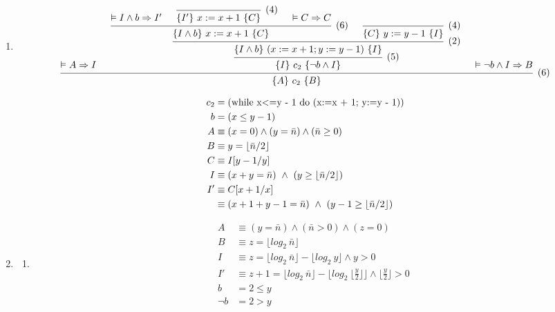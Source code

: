 \documentclass{article}
\begin{document}
\begin{enumerate}[1)]
    \item %
    \begin{align*}
        \begin{prooftree}
            \hypo{\vDash A \Rightarrow I}
            \hypo{\vDash I \land b \Rightarrow I'}
            \infer0[(4)]{\{I'\}\ x:=x + 1\ \{C\}}
            \hypo{\vDash C \Rightarrow C}
            \infer3[(6)]{\{I \land b\}\ x:=x + 1\ \{C\}}
            \infer0[(4)]{\{C\}\ y:=y - 1\ \{I\}}
            \infer2[(2)]{\{I \land b\}\ (x:=x + 1; y:=y - 1)\ \{I\}}
            \infer1[(5)]{\{I\}\ c_2\ \{\neg b \land I\}}
            \hypo{\vDash \neg b \land I \Rightarrow B}
            \infer3[(6)]{\{A\}\ c_2\ \{B\}}
        \end{prooftree}
    \end{align*}

    \begin{align*}
        c_2 &= \text{(while x\textless=y - 1 do (x:=x + 1; y:=y - 1))} \\
        b &= (x \leq y-1) \\
        A &\equiv (x = 0) \land (y = \bar{n}) \land (\bar{n} \geq 0) \\
        B &\equiv y = \lfloor \bar{n}/2 \rfloor \\
        C &\equiv I[y-1/y] \\
        I &\equiv (x + y = \bar{n})\ \land\ (y \geq \lfloor \bar{n} / 2 \rfloor) \\
        I' &\equiv C[x+1/x] \\
        &\equiv (x + 1 + y - 1 = \bar{n})\ \land\ (y - 1 \geq \lfloor \bar{n} / 2 \rfloor) \\
    \end{align*}

    \item %
    \begin{enumerate}
        \item %
        \begin{align*}
            A &\equiv (y = \bar{n}) \land (\bar{n} > 0) \land (z = 0) \\
            B &\equiv z = \lfloor log_2\ \bar{n} \rfloor \\
            I &\equiv z = \lfloor log_2\ \bar{n} \rfloor - \lfloor log_2\ y \rfloor \land y > 0 \\
            I' &\equiv z + 1 = \lfloor log_2\ \bar{n} \rfloor - \lfloor log_2\ \lfloor \frac{y}{2} \rfloor \rfloor
            \land \lfloor \frac{y}{2} \rfloor > 0 \\
            b &= 2 \leq y \\
            \neg b &= 2 > y
        \end{align*}


\end{enumerate}
\end{enumerate}
\end{document}
